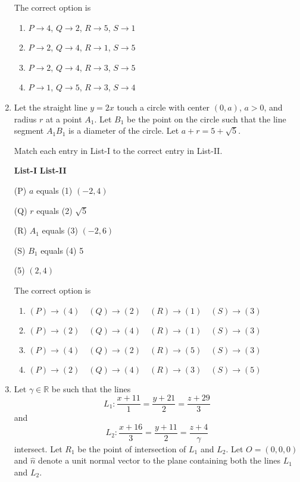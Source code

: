 \documentclass[12pt,a4paper]{article}
\begin{document}
\begin{enumerate}
The correct option is
\begin{enumerate}
    \item $P \rightarrow 4$, $Q \rightarrow 2$, $R \rightarrow 5$, $S \rightarrow 1$
    \item $P \rightarrow 2$, $Q \rightarrow 4$, $R \rightarrow 1$, $S \rightarrow 5$
    \item $P \rightarrow 2$, $Q \rightarrow 4$, $R \rightarrow 3$, $S \rightarrow 5$
    \item $P \rightarrow 1$, $Q \rightarrow 5$, $R \rightarrow 3$, $S \rightarrow 4$
\end{enumerate}


\item Let the straight line $y = 2x$ touch a circle with center $(0, a)$, $a > 0$, and radius $r$ at a point $A_1$.
Let $B_1$ be the point on the circle such that the line segment $A_1B_1$ is a diameter of the circle. Let $a + r = 5 + \sqrt{5}$.

Match each entry in List-I to the correct entry in List-II.

\textbf{List-I} \hfill \textbf{List-II}

(P) $a$ equals \hfill (1) $(-2, 4)$

(Q) $r$ equals \hfill (2) $\sqrt{5}$

(R) $A_1$ equals \hfill (3) $(-2, 6)$

(S) $B_1$ equals \hfill (4) 5

\hfill (5) $(2, 4)$

The correct option is
\begin{enumerate}
    \item $ (P) \rightarrow (4) \quad (Q) \rightarrow (2) \quad (R) \rightarrow (1) \quad (S) \rightarrow (3) $
    \item $ (P) \rightarrow (2) \quad (Q) \rightarrow (4) \quad (R) \rightarrow (1) \quad (S) \rightarrow (3) $
    \item $ (P) \rightarrow (4) \quad (Q) \rightarrow (2) \quad (R) \rightarrow (5) \quad (S) \rightarrow (3) $
    \item $ (P) \rightarrow (2) \quad (Q) \rightarrow (4) \quad (R) \rightarrow (3) \quad (S) \rightarrow (5) $
\end{enumerate}

\item Let $\gamma\in\mathbb{R}$ be such that the lines
\[L_{1}:\frac{x+11}{1}=\frac{y+21}{2}=\frac{z+29}{3}\]
and
\[L_{2}:\frac{x+16}{3}=\frac{y+11}{2}=\frac{z+4}{\gamma}\]
intersect. Let $R_{1}$ be the point of intersection of $L_{1}$ and $L_{2}$. Let $O=(0,0,0)$ and $\hat{n}$ denote a unit normal vector to the plane containing both the lines $L_{1}$ and $L_{2}$.


\end{enumerate}
\end{document}
